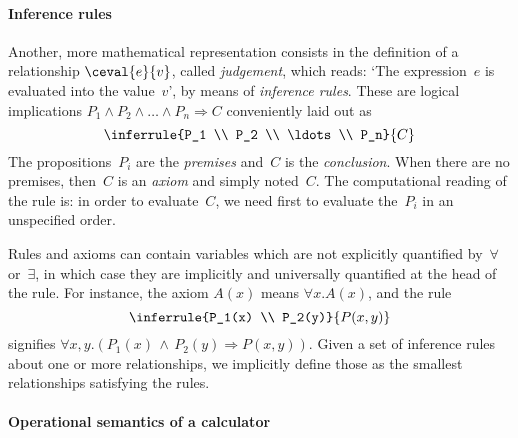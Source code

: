 \paragraph{Inference rules}

Another, more mathematical representation consists in the definition
of a relationship $\ceval{e}{v}$, called \emph{judgement}, which
reads: `The expression~$e$ is evaluated into the value~$v$', by means
of \emph{inference rules}. These are logical implications $P_1 \wedge
P_2 \wedge \ldots \wedge P_n \Rightarrow C$ conveniently laid out as
\begin{equation*}
\inferrule
  {P_1 \\ P_2 \\ \ldots \\ P_n}
  {C}
\end{equation*}
The propositions~$P_i$ are the \emph{premises} and~$C$ is the
\emph{conclusion}. When there are no premises, then~$C$ is an
\emph{axiom} and simply noted~$C$. The computational reading of the
rule is: in order to evaluate~$C$, we need first to evaluate the~$P_i$
in an unspecified order.

Rules and axioms can contain variables which are not explicitly
quantified by~$\forall$ or~$\exists$, in which case they are
implicitly and universally quantified at the head of the rule. For
instance, the axiom $A(x)$ means $\forall x.A(x)$, and the rule
\begin{equation*}
\inferrule
  {P_1(x) \\ P_2(y)}
  {P(x,y)}
\end{equation*}
signifies $\forall x,y.(P_1(x) \, \wedge \, P_2(y) \Rightarrow
P(x,y))$. Given a set of inference rules about one or more
relationships, we implicitly define those as the smallest
relationships satisfying the rules.

\paragraph{Operational semantics of a calculator}

